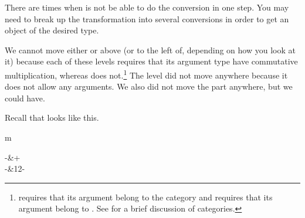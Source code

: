 There are times when \Language{} is not be able to do the conversion
in one step.
You may need to break up the transformation into several conversions
in order to get an object of the desired type.

We cannot move either  or 
above (or to the left of, depending on how you look at it)
 because each of these levels requires that its
argument type have commutative multiplication, whereas
 does not.\footnote{ requires
that its argument belong to the category  and
 requires that its argument belong to
. See
for a brief discussion of categories.}
The  level did not move anywhere
because it does not allow any arguments.
We also did not move the  part anywhere, but
we could have.
\begin{xtc}
\begin{xtccomment}
Recall that  looks like this.
\end{xtccomment}
\begin{spadsrc}
m 
\end{spadsrc}
\begin{TeXOutput}
\begin{fricasmath}{9}
\begin{MATRIX}{2}-{\TIMES \ImaginaryI }&\TIMES {}+\\\TIMES \ImaginaryI \TIMES %
-{}&12-{\TIMES \ImaginaryI }%
\end{MATRIX}%
\end{fricasmath}
\end{TeXOutput}
\end{xtc}
